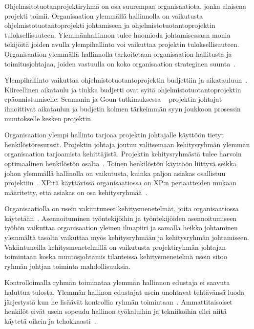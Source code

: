 \documentclass[finnish]{tktltiki2}
\theoremstyle{definition}
\theoremstyle{remark}
\begin{document}
Ohjelmsitotuotanprojektiryhmä on osa suurempaa organisaatiota, jonka alaisena projekti toimii. Organisaation ylemmällä hallinnolla on vaikutusta ohjelmistotuotantoprojekti johtamiseen ja ohjelmistotuotantoprojektin tuloksellisuuteen. Ylemmänhallinnon tulee huomioda johtamisessaan monia tekijöitä joiden avulla ylempihallinto voi vaikuttaa projektin tuloksellisuuteen. Organisaation ylemmällä hallinnolla tarkoitetaan organisaation hallitusta ja toimitusjohtajaa, joiden vastuulla on koko organisaation strateginen suunta~\cite{McLeod:2011:FAS:1978802.1978803}.

Ylempihallinto vaikuttaa ohjelmistotuotantoprojektin budjettiin ja aikatauluun~\cite{McLeod:2011:FAS:1978802.1978803}. Kiireellinen aikataulu ja tiukka budjetti ovat syitä ohjelmistotuotantoprojektin epäonnistumiselle. Seamanin ja Goun tutkimuksessa ~\cite{Guo:2008:SSP:1414004.1414046} projektin johtajat ilmoittivat aikataulun ja budjetin kolmen tärkeimmän syyn joukkoon prosessin muutokselle kesken projektin.

Organisaation ylempi hallinto tarjoaa projektin johtajalle käyttöön tietyt henkilöstöresurssit. Projektin johtaja joutuu valitsemaan kehitysryhmän ylemmän organisaation tarjoamista kehittäjistä. Projektin kehitysryhmästä tulee harvoin optimaalinen henkilöstön osalta~\cite{Dhomne:2012:ITL:2382887.2382899}. Toinen henkilöstön käyttöön liittyvä seikka johon ylemmällä hallinolla on vaikutusta, kuinka paljon asiakas osallistuu projektiin~\cite{McLeod:2011:FAS:1978802.1978803}. XP:tä käyttävissä organisaatiossa on XP:n periaatteiden mukaan määritetty, että asiakas on osa kehitysryhmää~\cite{796139}.

Organisaatiolla on usein vakiintuneet kehitysmenetelmät, joita organisaatiossa käytetään~\cite{McLeod:2011:FAS:1978802.1978803}. Asennoituminen työntekijöihin ja työntekijöiden asennoitumiseen työhön vaikuttaa organisaation yleinen ilmapiiri ja samalla heikko johtaminen ylemmältä tasolta vaikuttaa myös kehitysryhmään ja kehitysryhmän johtamiseen. Vakiintuneilla kehitysmenetelmillä on vaikutusta projektiryhmän johtajan toimintaan koska muutosjohtamis tilanteissa kehitysmenetelmä usein sitoo ryhmän johtjan toiminta mahdollisuuksia.

Kontrolloimalla ryhmän toiminataa ylemmän hallinnon edustaja ei saavuta haluttua tulosta. Ylemmän hallinon edustajat usein unohtavat tehtävänsä luoda järjestystä kun he lisäävät kontrollia ryhmän toimintaan~\cite{Augustine:2005:APM:1101779.1101781}. Ammattitaisoiset henkilöt eivät usein sopeudu hallinon työkaluihin ja tekniikoihin ellei niitä käytetä oikein ja tehokkaasti~\cite{Augustine:2005:APM:1101779.1101781}.   
\end{document}
